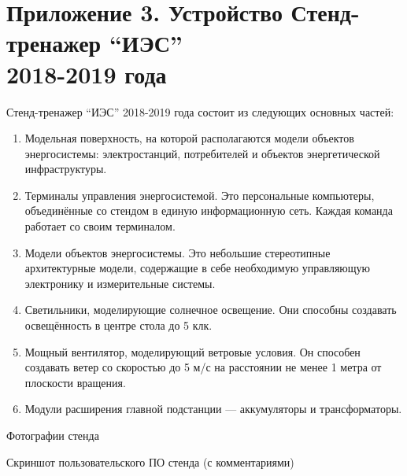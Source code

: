 \section*{Приложение 3. Устройство Стенд-тренажер “ИЭС” \\ 
2018-2019 года}

Стенд-тренажер “ИЭС” 2018-2019 года состоит из следующих основных частей:

\begin{enumerate}
    \item Модельная поверхность, на которой располагаются модели объектов энергосистемы: электростанций, потребителей и объектов энергетической инфраструктуры.
    \item Терминалы управления энергосистемой. Это персональные компьютеры, объединённые со стендом в единую информационную сеть. Каждая команда работает со своим терминалом.
    \item Модели объектов энергосистемы. Это небольшие стереотипные архитектурные модели, содержащие в себе необходимую управляющую электронику и измерительные системы.
    \item Светильники, моделирующие солнечное освещение. Они способны создавать освещённость в центре стола до 5 клк.
    \item Мощный вентилятор, моделирующий ветровые условия. Он способен создавать ветер со скоростью до 5 м/с на расстоянии не менее 1 метра от плоскости вращения.
    \item Модули расширения главной подстанции — аккумуляторы и трансформаторы.        
\end{enumerate}


\begin{center} Фотографии стенда \end{center}


\begin{center} Скриншот пользовательского ПО стенда (с комментариями)
 \end{center}
